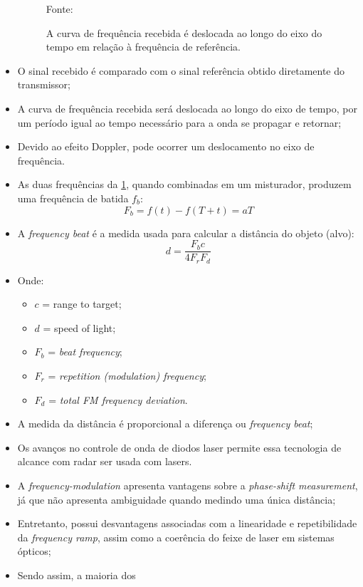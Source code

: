 \documentclass[xcolor=dvipsnames, aspectratio=169]{beamer}
\begin{document}
\begin{frame}
\begin{itemize}
\begin{figure}
            {Fonte: \cite{everett1995sensors}}
            \caption{A curva de frequência recebida é deslocada ao longo do eixo do tempo em relação à frequência de referência.}
            \label{fig:curva_de_freq}
        \end{figure}
        \item O sinal recebido é comparado com o sinal referência obtido diretamente do transmissor;
        \item A curva de frequência recebida será deslocada ao longo do eixo de tempo, por um período igual ao tempo necessário para a onda se propagar e retornar;
        \item Devido ao efeito Doppler, pode ocorrer um deslocamento no eixo de frequência.
        \item As duas frequências da \ref{fig:curva_de_freq}, quando combinadas em um misturador, produzem uma frequência de batida $f_{b}$:
        \begin{equation}
            F_{b} = f(t) - f(T + t) = aT
        \end{equation}
        \item A \textit{frequency beat} é a medida usada para calcular a distância do objeto (alvo):
        \begin{equation}
            d = \frac{F_{b}c}{4F_{r}F{_d}}
        \end{equation}
        \item Onde:
        \begin{itemize}
            \item $c$ = range to target;
            \item $d$ = speed of light;
            \item $F_{b}$ = \textit{beat frequency};
            \item $F_{r}$ = \textit{repetition (modulation) frequency};
            \item $F_{d}$ = \textit{total FM frequency deviation}.
        \end{itemize}
        \item A medida da distância é proporcional a diferença ou \textit{frequency beat};
        \item Os avanços no controle de onda de diodos laser permite essa tecnologia de alcance com radar ser usada com lasers.
        \item A \textit{frequency-modulation} apresenta vantagens sobre a \textit{phase-shift measurement}, já que não apresenta ambiguidade quando medindo uma única distância;
        \item Entretanto, possui desvantagens associadas com a linearidade e repetibilidade da \textit{frequency ramp}, assim como a coerência do feixe de laser em sistemas ópticos;
        \item Sendo assim, a maioria dos
	\end{itemize}
\end{frame}
\end{document}
